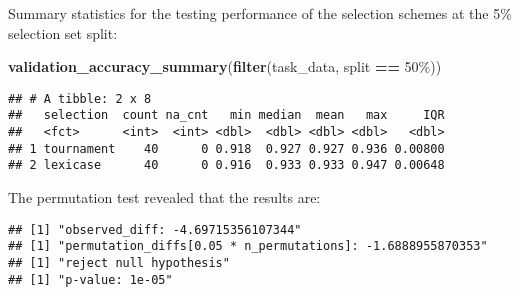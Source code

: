 \documentclass[
]{book}
\newenvironment{Shaded}{\begin{snugshade}}{\end{snugshade}}
\newcommand{\AttributeTok}[1]{\textcolor[rgb]{0.13,0.29,0.53}{#1}}
\newcommand{\DecValTok}[1]{\textcolor[rgb]{0.00,0.00,0.81}{#1}}
\newcommand{\FunctionTok}[1]{\textcolor[rgb]{0.13,0.29,0.53}{\textbf{#1}}}
\newcommand{\NormalTok}[1]{#1}
\newcommand{\OtherTok}[1]{\textcolor[rgb]{0.56,0.35,0.01}{#1}}
\newcommand{\SpecialCharTok}[1]{\textcolor[rgb]{0.81,0.36,0.00}{\textbf{#1}}}
\newcommand{\StringTok}[1]{\textcolor[rgb]{0.31,0.60,0.02}{#1}}
\begin{document}
Summary statistics for the testing performance of the selection schemes at the 5\% selection set split:

\begin{Shaded}
\begin{Highlighting}[]
\FunctionTok{validation\_accuracy\_summary}\NormalTok{(}\FunctionTok{filter}\NormalTok{(task\_data, split }\SpecialCharTok{==} \StringTok{\textquotesingle{}50\%\textquotesingle{}}\NormalTok{))}
\end{Highlighting}
\end{Shaded}

\begin{verbatim}
## # A tibble: 2 x 8
##   selection  count na_cnt   min median  mean   max     IQR
##   <fct>      <int>  <int> <dbl>  <dbl> <dbl> <dbl>   <dbl>
## 1 tournament    40      0 0.918  0.927 0.927 0.936 0.00800
## 2 lexicase      40      0 0.916  0.933 0.933 0.947 0.00648
\end{verbatim}

The permutation test revealed that the results are:

\begin{Shaded}
\end{Shaded}

\begin{verbatim}
## [1] "observed_diff: -4.69715356107344"
## [1] "permutation_diffs[0.05 * n_permutations]: -1.6888955870353"
## [1] "reject null hypothesis"
## [1] "p-value: 1e-05"
\end{verbatim}
\end{document}
